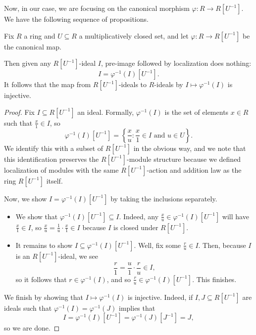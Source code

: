 Now, in our case, we are focusing on the canonical morphism $\varphi:R\to R\left[U^{-1}\right]$. We have the following sequence of propositions.
\begin{lemma} \label{lem:localidealsa}
	Fix $R$ a ring and $U\subseteq R$ a multiplicatively closed set, and let $\varphi:R\to R\left[U^{-1}\right]$ be the canonical map.
	
	Then given any $R\left[U^{-1}\right]$-ideal $I$, pre-image followed by localization does nothing:
	\[I=\varphi^{-1}(I)\left[U^{-1}\right].\]
	It follows that the map from $R\left[U^{-1}\right]$-ideals to $R$-ideals by $I\mapsto\varphi^{-1}(I)$ is injective.
\end{lemma}
\begin{proof}
	Fix $I\subseteq R\left[U^{-1}\right]$ an ideal. Formally, $\varphi^{-1}(I)$ is the set of elements $x\in R$ such that $\frac x1\in I$, so
	\[\varphi^{-1}(I)\left[U^{-1}\right]=\left\{\frac xu:\frac x1\in I\text{ and }u\in U\right\}.\]
	We identify this with a subset of $R\left[U^{-1}\right]$ in the obvious way, and we note that this identification preserves the $R\left[U^{-1}\right]$-module structure because we defined localization of modules with the same $R\left[U^{-1}\right]$-action and addition law as the ring $R\left[U^{-1}\right]$ itself.

	Now, we show $I=\varphi^{-1}(I)\left[U^{-1}\right]$ by taking the inclusions separately.
	\begin{itemize}
		\item We show that $\varphi^{-1}(I)\left[U^{-1}\right]\subseteq I$. Indeed, any $\frac xu\in\varphi^{-1}(I)\left[U^{-1}\right]$ will have $\frac x1\in I$, so $\frac xu=\frac1u\cdot\frac x1\in I$ because $I$ is closed under $R\left[U^{-1}\right]$.
		\item It remains to show $I\subseteq\varphi^{-1}(I)\left[U^{-1}\right]$. Well, fix some $\frac ru\in I$. Then, because $I$ is an $R\left[U^{-1}\right]$-ideal, we see
		\[\frac r1=\frac u1\cdot\frac ru\in I,\]
		so it follows that $r\in\varphi^{-1}(I)$, and so $\frac ru\in\varphi^{-1}(I)\left[U^{-1}\right]$. This finishes.
	\end{itemize}
	We finish by showing that $I\mapsto\varphi^{-1}(I)$ is injective. Indeed, if $I,J\subseteq R\left[U^{-1}\right]$ are ideals such that $\varphi^{-1}(I)=\varphi^{-1}(J)$ implies that
	\[I=\varphi^{-1}(I)\left[U^{-1}\right]=\varphi^{-1}(J)\left[J^{-1}\right]=J,\]
	so we are done.
\end{proof}
